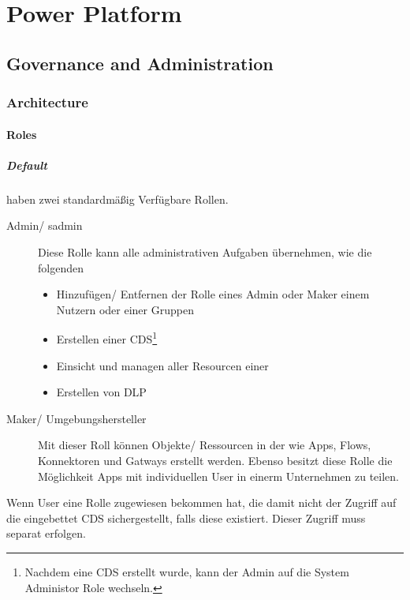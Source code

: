 \pagebreak
\chapter{Power Platform}
\setcounter{section}{0}

\section{Governance and Administration}

\subsection{Architecture}
\subsubsection{Roles}
\paragraph*{Default}
\Env haben zwei standardmäßig Verfügbare Rollen. 
\begin{description}
	\item[\Env Admin/ \Env sadmin] Diese Rolle kann alle administrativen Aufgaben übernehmen, wie die folgenden
	\begin{itemize}
		\item Hinzufügen/ Entfernen der Rolle eines \Env Admin oder Maker einem Nutzern oder einer Gruppen
		\item Erstellen einer \gls{CDS}\footnote{Nachdem eine \gls{CDS} erstellt wurde, kann der \Env Admin auf die System Administor Role wechseln.}
		\item Einsicht und managen aller Resourcen einer \Env
		\item Erstellen von \gls{DLP}
	\end{itemize}
	\item[\Env Maker/ Umgebungshersteller] Mit dieser Roll können Objekte/ Ressourcen in der \Env wie Apps, Flows, Konnektoren und Gatways erstellt werden. Ebenso besitzt diese Rolle die Möglichkeit Apps mit individuellen User in einerm Unternehmen zu teilen.
\end{description}

Wenn User eine Rolle zugewiesen bekommen hat, die damit nicht der Zugriff auf die eingebettet \gls{CDS} sichergestellt, falls diese existiert. Dieser Zugriff muss separat erfolgen.\\

